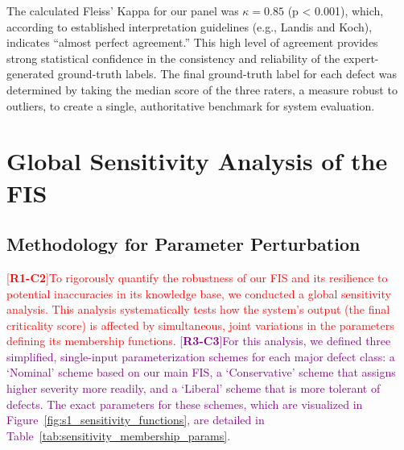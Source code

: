 \documentclass[energies,supfile,submit,pdftex,moreauthors]{Definitions/mdpi}
\newcommand{\revtag}[2]{[\textbf{R#1-C#2}]}
\newcommand{\Rone}[1]{\textcolor{red}{#1}}
\newcommand{\Rthree}[1]{\textcolor{purple}{#1}}
\begin{document}
The calculated Fleiss' Kappa for our panel was \(\kappa = 0.85\) (p < 0.001), which, according to established interpretation guidelines (e.g., Landis and Koch), indicates ``almost perfect agreement.'' This high level of agreement provides strong statistical confidence in the consistency and reliability of the expert-generated ground-truth labels. The final ground-truth label for each defect was determined by taking the median score of the three raters, a measure robust to outliers, to create a single, authoritative benchmark for system evaluation.

\section{Global Sensitivity Analysis of the FIS}\label{sec:sensitivity}
\subsection{Methodology for Parameter Perturbation}
\Rone{\revtag{1}{2}To rigorously quantify the robustness of our FIS and its resilience to potential inaccuracies in its knowledge base, we conducted a global sensitivity analysis. This analysis systematically tests how the system's output (the final criticality score) is affected by simultaneous, joint variations in the parameters defining its membership functions.} \Rthree{\revtag{3}{3}For this analysis, we defined three simplified, single-input parameterization schemes for each major defect class: a `Nominal' scheme based on our main FIS, a `Conservative' scheme that assigns higher severity more readily, and a `Liberal' scheme that is more tolerant of defects. The exact parameters for these schemes, which are visualized in Figure~\ref{fig:s1_sensitivity_functions}, are detailed in Table~\ref{tab:sensitivity_membership_params}.}
\end{document}

